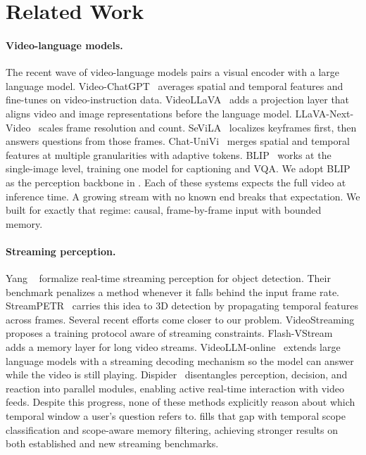 \section{Related Work}
\label{sec:related}

\paragraph{Video-language models.}
The recent wave of video-language models pairs a visual encoder with a large language model.
Video-ChatGPT~\cite{maaz2023videochatgpt} averages spatial and temporal features and fine-tunes on video-instruction data.
VideoLLaVA~\cite{lin2023videollava} adds a projection layer that aligns video and image representations before the language model.
LLaVA-Next-Video~\cite{zhang2024llavanextvideo} scales frame resolution and count.
SeViLA~\cite{yu2023sevila} localizes keyframes first, then answers questions from those frames.
Chat-UniVi~\cite{jin2024chatunivi} merges spatial and temporal features at multiple granularities with adaptive tokens.
BLIP~\cite{li2022blip} works at the single-image level, training one model for captioning and VQA. We adopt BLIP as the perception backbone in \ours.
Each of these systems expects the full video at inference time. A growing stream with no known end breaks that expectation. We built \ours for exactly that regime: causal, frame-by-frame input with bounded memory.

\paragraph{Streaming perception.}
Yang \etal~\cite{yang2022real} formalize real-time streaming perception for object detection. Their benchmark penalizes a method whenever it falls behind the input frame rate.
StreamPETR~\cite{wang2023streampetr} carries this idea to 3D detection by propagating temporal features across frames.
Several recent efforts come closer to our problem.
VideoStreaming~\cite{qian2024streaming} proposes a training protocol aware of streaming constraints.
Flash-VStream~\cite{zhang2024flashvstream} adds a memory layer for long video streams.
VideoLLM-online~\cite{chen2024videollmonline} extends large language models with a streaming decoding mechanism so the model can answer while the video is still playing.
Dispider~\cite{he2024dispider} disentangles perception, decision, and reaction into parallel modules, enabling active real-time interaction with video feeds.
Despite this progress, none of these methods explicitly reason about which temporal window a user's question refers to. \ours fills that gap with temporal scope classification and scope-aware memory filtering, achieving stronger results on both established and new streaming benchmarks.


